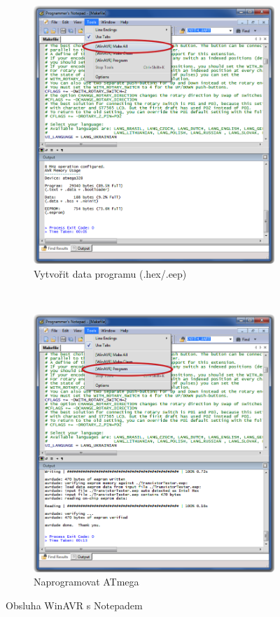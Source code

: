 \begin{figure}[H]
  \begin{subfigure}[b]{.5\textwidth}
    \centering
    \includegraphics[width=.85\textwidth]{../PNG/Notepad_make.png}
    \caption{Vytvořit data programu (.hex/.eep)}
  \end{subfigure}
  ~
  \begin{subfigure}[b]{.5\textwidth}
    \centering
    \includegraphics[width=.85\textwidth]{../PNG/Notepad_program.png}
    \caption{Naprogramovat ATmega}
  \end{subfigure}
  \caption{Obsluha WinAVR s Notepadem}
  \label{fig:WinAVR2}
\end{figure}

